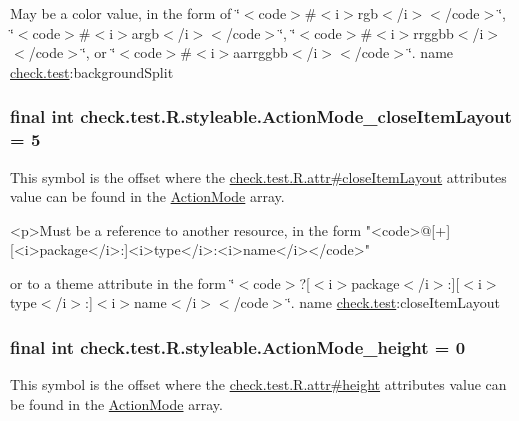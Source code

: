 May be a color value, in the form of \char`\"{}$<$code$>$\#$<$i$>$rgb$<$/i$>$$<$/code$>$\char`\"{}, \char`\"{}$<$code$>$\#$<$i$>$argb$<$/i$>$$<$/code$>$\char`\"{}, \char`\"{}$<$code$>$\#$<$i$>$rrggbb$<$/i$>$$<$/code$>$\char`\"{}, or \char`\"{}$<$code$>$\#$<$i$>$aarrggbb$<$/i$>$$<$/code$>$\char`\"{}.  name \hyperlink{namespacecheck_1_1test}{check.\+test}\+:background\+Split \hypertarget{classcheck_1_1test_1_1_r_1_1styleable_a6ac0eea3f70ecdbef1e54a263fcd19f9}{}
\subsubsection[{Action\+Mode\+\_\+close\+Item\+Layout}]{\setlength{\rightskip}{0pt plus 5cm}final int check.\+test.\+R.\+styleable.\+Action\+Mode\+\_\+close\+Item\+Layout = 5\hspace{0.3cm}{\ttfamily [static]}}\label{classcheck_1_1test_1_1_r_1_1styleable_a6ac0eea3f70ecdbef1e54a263fcd19f9}
This symbol is the offset where the \hyperlink{classcheck_1_1test_1_1_r_1_1attr_ae35720ea07e5591fd2b0f64f7e642fd3}{check.\+test.\+R.\+attr\#close\+Item\+Layout} attribute\textquotesingle{}s value can be found in the \hyperlink{classcheck_1_1test_1_1_r_1_1styleable_a06d2fd2de1e471a432f3e49eea7b8015}{Action\+Mode} array.

\begin{DoxyVerb}      <p>Must be a reference to another resource, in the form "<code>@[+][<i>package</i>:]<i>type</i>:<i>name</i></code>"
\end{DoxyVerb}
 or to a theme attribute in the form \char`\"{}$<$code$>$?\mbox{[}$<$i$>$package$<$/i$>$\+:\mbox{]}\mbox{[}$<$i$>$type$<$/i$>$\+:\mbox{]}$<$i$>$name$<$/i$>$$<$/code$>$\char`\"{}.  name \hyperlink{namespacecheck_1_1test}{check.\+test}\+:close\+Item\+Layout \hypertarget{classcheck_1_1test_1_1_r_1_1styleable_a2c8d25c4f35e83ab690e40cb3a840c72}{}
\subsubsection[{Action\+Mode\+\_\+height}]{\setlength{\rightskip}{0pt plus 5cm}final int check.\+test.\+R.\+styleable.\+Action\+Mode\+\_\+height = 0\hspace{0.3cm}{\ttfamily [static]}}\label{classcheck_1_1test_1_1_r_1_1styleable_a2c8d25c4f35e83ab690e40cb3a840c72}
This symbol is the offset where the \hyperlink{classcheck_1_1test_1_1_r_1_1attr_ad0373977141facd56b9a985852b9a5c4}{check.\+test.\+R.\+attr\#height} attribute\textquotesingle{}s value can be found in the \hyperlink{classcheck_1_1test_1_1_r_1_1styleable_a06d2fd2de1e471a432f3e49eea7b8015}{Action\+Mode} array.

